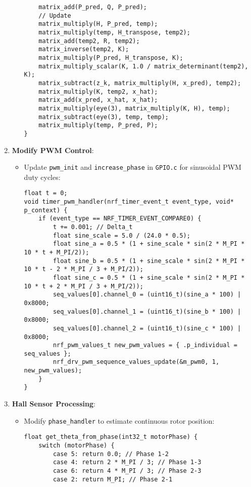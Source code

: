 \documentclass[a4paper,11pt]{article}
\begin{document}
\begin{enumerate}
\begin{itemize}
\begin{lstlisting}
    matrix_add(P_pred, Q, P_pred);
    // Update
    matrix_multiply(H, P_pred, temp);
    matrix_multiply(temp, H_transpose, temp2);
    matrix_add(temp2, R, temp2);
    matrix_inverse(temp2, K);
    matrix_multiply(P_pred, H_transpose, K);
    matrix_multiply_scalar(K, 1.0 / matrix_determinant(temp2), K);
    matrix_subtract(z_k, matrix_multiply(H, x_pred), temp2);
    matrix_multiply(K, temp2, x_hat);
    matrix_add(x_pred, x_hat, x_hat);
    matrix_multiply(eye(3), matrix_multiply(K, H), temp);
    matrix_subtract(eye(3), temp, temp);
    matrix_multiply(temp, P_pred, P);
}
        \end{lstlisting}
    \end{itemize}
    \item \textbf{Modify PWM Control}:
    \begin{itemize}
        \item Update \texttt{pwm\_init} and \texttt{increase\_phase} in \texttt{GPIO.c} for sinusoidal PWM duty cycles:
        \begin{lstlisting}
float t = 0;
void timer_pwm_handler(nrf_timer_event_t event_type, void* p_context) {
    if (event_type == NRF_TIMER_EVENT_COMPARE0) {
        t += 0.001; // Delta_t
        float sine_scale = 5.0 / (24.0 * 0.5);
        float sine_a = 0.5 * (1 + sine_scale * sin(2 * M_PI * 10 * t + M_PI/2));
        float sine_b = 0.5 * (1 + sine_scale * sin(2 * M_PI * 10 * t - 2 * M_PI / 3 + M_PI/2));
        float sine_c = 0.5 * (1 + sine_scale * sin(2 * M_PI * 10 * t + 2 * M_PI / 3 + M_PI/2));
        seq_values[0].channel_0 = (uint16_t)(sine_a * 100) | 0x8000;
        seq_values[0].channel_1 = (uint16_t)(sine_b * 100) | 0x8000;
        seq_values[0].channel_2 = (uint16_t)(sine_c * 100) | 0x8000;
        nrf_pwm_values_t new_pwm_values = { .p_individual = seq_values };
        nrf_drv_pwm_sequence_values_update(&m_pwm0, 1, new_pwm_values);
    }
}
        \end{lstlisting}
    \end{itemize}
    \item \textbf{Hall Sensor Processing}:
    \begin{itemize}
        \item Modify \texttt{phase\_handler} to estimate continuous rotor position:
        \begin{lstlisting}
float get_theta_from_phase(int32_t motorPhase) {
    switch (motorPhase) {
        case 5: return 0.0; // Phase 1-2
        case 4: return 2 * M_PI / 3; // Phase 1-3
        case 6: return 4 * M_PI / 3; // Phase 2-3
        case 2: return M_PI; // Phase 2-1

\end{lstlisting}
\end{itemize}
\end{enumerate}
\end{document}
